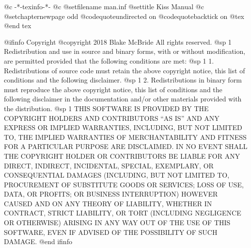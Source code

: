     @c -*-texinfo-*-
@c %
@setfilename man.inf
@settitle Kiss Manual
@c %
@setchapternewpage odd
@codequoteundirected on
@codequotebacktick on
@tex
\global\def\linkcolor{0 0 1}  %
\global\def\urlcolor{0 0 1}   %
@end tex

@ifinfo
Copyright  @copyright{} 2018 Blake McBride
All rights reserved.
@sp 1
Redistribution and use in source and binary forms, with or without
modification, are permitted provided that the following conditions are
met:
@sp 1
1. Redistributions of source code must retain the above copyright
notice, this list of conditions and the following disclaimer.
@sp 1
2. Redistributions in binary form must reproduce the above copyright
notice, this list of conditions and the following disclaimer in the
documentation and/or other materials provided with the distribution.
@sp 1
THIS SOFTWARE IS PROVIDED BY THE COPYRIGHT HOLDERS AND CONTRIBUTORS
``AS IS'' AND ANY EXPRESS OR IMPLIED WARRANTIES, INCLUDING, BUT NOT
LIMITED TO, THE IMPLIED WARRANTIES OF MERCHANTABILITY AND FITNESS FOR
A PARTICULAR PURPOSE ARE DISCLAIMED. IN NO EVENT SHALL THE COPYRIGHT
HOLDER OR CONTRIBUTORS BE LIABLE FOR ANY DIRECT, INDIRECT, INCIDENTAL,
SPECIAL, EXEMPLARY, OR CONSEQUENTIAL DAMAGES (INCLUDING, BUT NOT
LIMITED TO, PROCUREMENT OF SUBSTITUTE GOODS OR SERVICES; LOSS OF USE,
DATA, OR PROFITS; OR BUSINESS INTERRUPTION) HOWEVER CAUSED AND ON ANY
THEORY OF LIABILITY, WHETHER IN CONTRACT, STRICT LIABILITY, OR TORT
(INCLUDING NEGLIGENCE OR OTHERWISE) ARISING IN ANY WAY OUT OF THE USE
OF THIS SOFTWARE, EVEN IF ADVISED OF THE POSSIBILITY OF SUCH DAMAGE.
@end ifinfo

